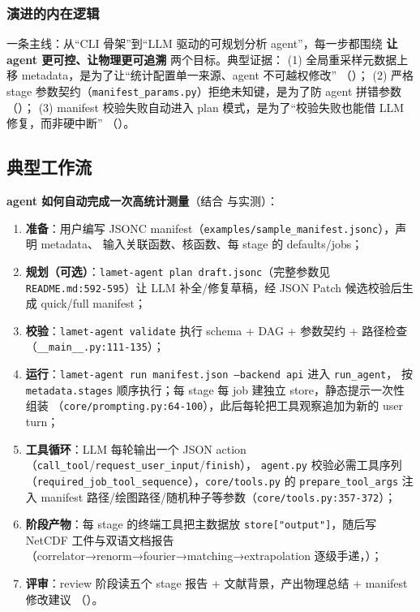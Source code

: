 \documentclass[UTF8]{ctexart}
\begin{document}
\subsubsection{演进的内在逻辑}

\textcolor{idea}{一条主线}：从“CLI 骨架”到“LLM 驱动的可规划分析 agent”，每一步都围绕
\textbf{让 agent 更可控、让物理更可追溯} 两个目标。典型证据：
(1) 全局重采样元数据上移 metadata，是为了让“统计配置单一来源、agent 不可越权修改”
（\texttt{}）；
(2) 严格 stage 参数契约（\texttt{manifest\_params.py}）拒绝未知键，是为了防 agent 拼错参数
（\texttt{}）；
(3) manifest 校验失败自动进入 plan 模式，是为了“校验失败也能借 LLM 修复，而非硬中断”
（\texttt{}）。

\subsection{典型工作流}

\textbf{agent 如何自动完成一次高统计测量}（结合 \texttt{} 与实测）：

\begin{enumerate}
\item \textbf{准备}：用户编写 JSONC manifest（\texttt{examples/sample\_manifest.jsonc}），声明 metadata、
输入关联函数、核函数、每 stage 的 defaults/jobs；
\item \textbf{规划（可选）}：\texttt{lamet-agent plan draft.jsonc}（完整参数见
\texttt{\nolinkurl{README.md:592-595}}）让 LLM 补全/修复草稿，经 JSON Patch 候选校验后生成 quick/full manifest；
\item \textbf{校验}：\texttt{lamet-agent validate} 执行 schema + DAG + 参数契约 + 路径检查
（\texttt{\nolinkurl{__main__.py:111-135}}）；
\item \textbf{运行}：\texttt{lamet-agent run manifest.json --backend api} 进入 \texttt{run\_agent}，
按 \texttt{metadata.stages} 顺序执行；每 stage 每 job 建独立 store，静态提示一次性组装
（\texttt{\nolinkurl{core/prompting.py:64-100}}），此后每轮把工具观察追加为新的 user turn；
\item \textbf{工具循环}：LLM 每轮输出一个 JSON action（\texttt{call\_tool}/\texttt{request\_user\_input}/\texttt{finish}），
\texttt{agent.py} 校验必需工具序列（\texttt{\nolinkurl{required_job_tool_sequence}}），\texttt{core/tools.py} 的
\texttt{\nolinkurl{prepare_tool_args}} 注入 manifest 路径/绘图路径/随机种子等参数（\texttt{\nolinkurl{core/tools.py:357-372}}）；
\item \textbf{阶段产物}：每 stage 的终端工具把主数据放 \texttt{store["output"]}，随后写 NetCDF 工件与双语文档报告
（correlator→renorm→fourier→matching→extrapolation 逐级手递，\texttt{}）；
\item \textbf{评审}：review 阶段读五个 stage 报告 + 文献背景，产出物理总结 + manifest 修改建议
（\texttt{}）。
\end{enumerate}
\end{document}
